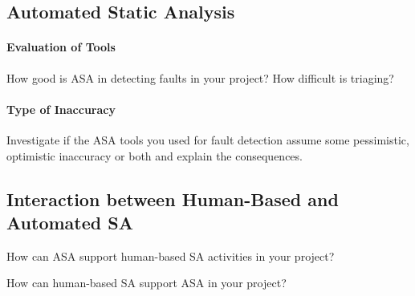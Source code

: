 \documentclass{scrartcl}
\begin{document}
\subsection{Automated Static Analysis}

\paragraph{Evaluation of Tools}
How good is ASA in detecting faults in your project? How difficult is triaging?

\paragraph{Type of Inaccuracy}
Investigate if the ASA tools you used for fault detection assume some
pessimistic, optimistic inaccuracy or both and explain the consequences.


\subsection{Interaction between Human-Based and Automated SA}

How can ASA support human-based SA activities in your project?

How can human-based SA support ASA in your project?
\end{document}
